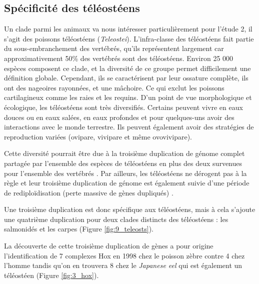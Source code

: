 \subsection{Spécificité des téléostéens}\label{teleost}
\par Un clade parmi les animaux va nous intéresser particulièrement pour l’étude 2, il s’agit des poissons téléostéens (\textit{Teleostei}). L’infra-classe des téléostéens fait partie du sous-embranchement des vertébrés, qu’ils représentent largement car approximativement 50\% des vertébrés sont des téléostéens. Environ 25 000 espèces composent ce clade, et la diversité de ce groupe permet difficilement une définition globale. Cependant, ils se caractérisent par leur ossature complète, ils ont des nageoires rayonnées, et une mâchoire. Ce qui exclut les poissons cartilagineux comme les raies et les requins. D’un point de vue morphologique et écologique, les téléostéens sont très diversifiés. Certains peuvent vivre en eaux douces ou en eaux salées, en eaux profondes et pour quelques-uns avoir des interactions avec le monde terrestre. Ils peuvent également avoir des stratégies de reproduction variées (ovipare, vivipare et même ovovivipare). 
\par Cette diversité pourrait être due à la troisième duplication de génome complet partagée par l’ensemble des espèces de téléostéens en plus des deux survenues pour l’ensemble des vertébrés \parencite{ravi_rapidly_2008, taylor_genome_2003}. Par ailleurs, les téléostéens ne dérogent pas à la règle et leur troisième duplication de génome est également suivie d’une période de rediploïdisation (perte massive de gènes dupliqués) \parencite{inoue_rapid_2015}. 
\par Une troisième duplication est donc spécifique aux téléostéens, mais à cela s’ajoute une quatrième duplication pour deux clades distincts des téléostéens : les salmonidés et les carpes \parencite{jaillon_genome_2004, lien_atlantic_2016}  (Figure \ref{fig:9_teleosts}).
\par La découverte de cette troisième duplication de gènes a pour origine l’identification de 7 complexes Hox en 1998 chez le poisson zèbre contre 4 chez l’homme \parencite{amores_zebrafish_1998} tandis qu’on en trouvera 8 chez le \textit{Japanese eel} qui est également un téléostéen \parencite{guo_hox_2010} (Figure \ref{fig:3_hox}). \newpage

